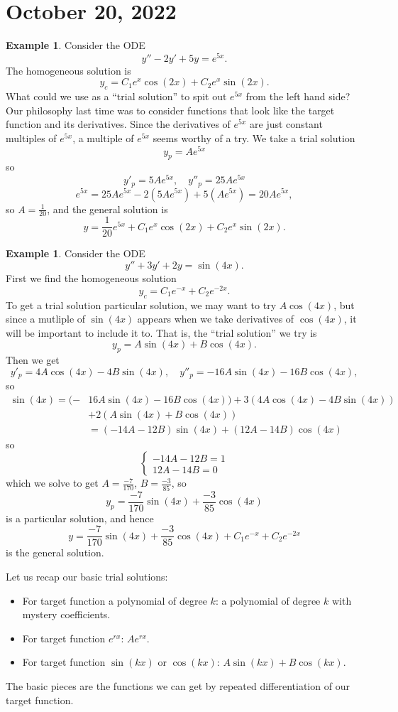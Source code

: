 \documentclass[12pt]{amsart}
\numberwithin{equation}{section}
\theoremstyle{plain} %
\newcommand{\Oct}[1]{\section{October #1, 2022}}
\theoremstyle{definition}
\newtheorem{ex}[equation]{Example}
\theoremstyle{remark}
\begin{document}
\Oct{20}

\begin{ex} Consider the ODE
\[ y'' - 2y' + 5y = e^{5x}.\]
The homogeneous solution is
\[ y_c =C_1 e^{x}\cos(2x) + C_2 e^{x}\sin(2x).\]
What could we use as a ``trial solution'' to spit out $e^{5x}$ from the left hand side? Our philosophy last time was to consider functions that look like the target function and its derivatives. Since the derivatives of $e^{5x}$ are just constant multiples of $e^{5x}$, a multiple of $e^{5x}$ seems worthy of a try.
We take a trial solution 
\[y_p = A e^{5x}\]
so
\[ y'_p = 5A e^{5x}, \quad y''_p = 25 Ae^{5x}\]
\[ e^{5x} = 25A e^{5x} - 2(5A e^{5x}) + 5(A e^{5x}) = 20A e^{5x},\]
so $A=\frac{1}{20}$, and the general solution is
\[ y= \frac{1}{20} e^{5x} + C_1 e^{x}\cos(2x) + C_2 e^{x}\sin(2x).\]
\end{ex}

\begin{ex} Consider the ODE
\[ y'' + 3y' + 2y= \sin(4x).\]
First we find the homogeneous solution
\[ y_c = C_1 e^{-x} + C_2 e^{-2x}.\]
To get a trial solution particular solution, we may want to try $A \cos(4x)$, but since a mutliple of $\sin(4x)$ appears when we take derivatives of $\cos(4x)$, it will be important to include it to. That is, the ``trial solution'' we try is
\[ y_p = A \sin(4x) + B \cos(4x).\]
Then we get 
\[ y'_p = 4A\cos(4x) - 4B \sin(4x), \quad y''_p = - 16A \sin(4x) - 16B\cos(4x),\]
so
\begin{align*} \sin(4x) = (- &16A \sin(4x) - 16B\cos(4x)) + 3 (4A\cos(4x) - 4B \sin(4x)) \\&+ 2(A \sin(4x) + B \cos(4x)) \\&= (-14A-12B) \sin(4x) + (12A-14B) \cos(4x)\end{align*}
so \[ \begin{cases} -14A-12B =1 \\
12A-14B=0\end{cases}\]
which we solve to get $A=\frac{-7}{170}$, $B=\frac{-3}{85}$, so 
\[ y_p = \frac{-7}{170} \sin(4x) + \frac{-3}{85} \cos(4x)\]
is a particular solution, and hence
\[y=\frac{-7}{170} \sin(4x) + \frac{-3}{85} \cos(4x) +C_1 e^{-x} + C_2 e^{-2x}\]
is the general solution.
\end{ex}

Let us recap our basic trial solutions:
\begin{itemize}
\item For target function a polynomial of degree $k$: a polynomial of degree $k$ with mystery coefficients.
\item For target function $e^{rx}$: $Ae^{rx}$.
\item For target function $\sin(kx)$ or $\cos(kx)$: $A \sin(kx) + B \cos(kx)$.
\end{itemize}
The basic pieces are the functions we can get by repeated differentiation of our target function.
\end{document}
